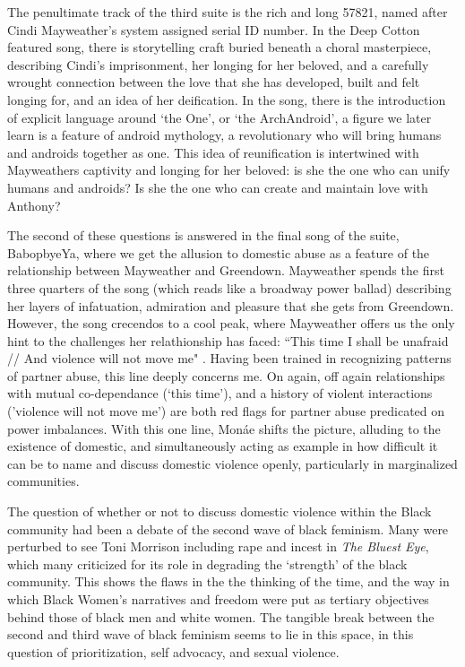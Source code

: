 \documentclass[a4paper, 11pt]{article} %
\begin{document}
The penultimate track of the third suite is the rich and long 57821, named after Cindi Mayweather's system assigned serial ID number.
In the Deep Cotton featured song, there is storytelling craft buried beneath a choral masterpiece, describing Cindi's imprisonment, her longing for her beloved, and a carefully wrought connection between the love that she has developed, built and felt longing for, and an idea of her deification.
In the song, there is the introduction of explicit language around `the One', or `the ArchAndroid', a figure we later learn is a feature of android mythology, a revolutionary who will bring humans and androids together as one.
This idea of reunification is intertwined with Mayweathers captivity and longing for her beloved: is she the one who can unify humans and androids? Is she the one who can create and maintain love with Anthony?

The second of these questions is answered in the final song of the suite, BabopbyeYa, where we get the allusion to domestic abuse as a feature of the relationship between Mayweather and Greendown.
Mayweather spends the first three quarters of the song (which reads like a broadway power ballad) describing her layers of infatuation, admiration and pleasure that she gets from Greendown.
However, the song crecendos to a cool peak, where Mayweather offers us the only hint to the challenges her relathionship has faced: ``This time I shall be unafraid // And violence will not move me" \cite{babopbyeya}.
Having been trained in recognizing patterns of partner abuse, this line deeply concerns me.
On again, off again relationships with mutual co-dependance (`this time'), and a history of violent interactions ('violence will not move me') are both red flags for partner abuse predicated on power imbalances.
With this one line, Mon\'ae shifts the picture, alluding to the existence of domestic, and simultaneously acting as example in how difficult it can be to name and discuss domestic violence openly, particularly in marginalized communities.

The question of whether or not to discuss domestic violence within the Black community had been a debate of the second wave of black feminism.
Many were perturbed to see Toni Morrison including rape and incest in \emph{The Bluest Eye}, which many criticized for its role in degrading the `strength' of the black community.
This shows the flaws in the the thinking of the time, and the way in which Black Women's narratives and freedom were put as tertiary objectives behind those of black men and white women.
The tangible break between the second and third wave of black feminism seems to lie in this space, in this question of prioritization, self advocacy, and sexual violence.
\end{document}
